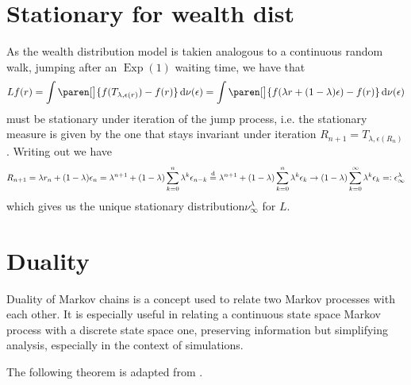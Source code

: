 \documentclass{article}
\begin{document}
{\section{Stationary for wealth dist}

As the wealth distribution model is takien analogous to a continuous random walk, jumping after an $\operatorname*{Exp}(1)$ waiting time, we have that
\[
Lf(r)
= \int \paren[\big]{f(T_{\lambda, \epsilon(r)}) - f(r) } \diff \nu(\epsilon)
= \int \paren[\big]{f(\lambda r + (1 - \lambda)\epsilon) - f(r) } \diff \nu(\epsilon)
\]
must be stationary under iteration of the jump process, i.e. the stationary measure is given by the one that stays invariant under iteration $R_{n+1} = T_{\lambda, \epsilon(R_n)}$. Writing out we have
\[
R_{n+1} = \lambda r_n + (1-\lambda)\epsilon_n
\\= \lambda^{n+1} + (1-\lambda)\sum_{k=0}^n \lambda^{k} \epsilon_{n-k}
\\\overset{\mathop{}\!\mathrm{d}}{=} \lambda^{n+1} + (1-\lambda)\sum_{k=0}^n \lambda^{k} \epsilon_{k}
\to
 (1-\lambda)\sum_{k=0}^{\infty} \lambda^{k} \epsilon_{k} =\vcentcolon \epsilon_{\infty}^{\lambda}
\]
which gives us the unique stationary distribution$\nu_{\infty}^{\lambda}$ for $L$.



\section{Duality}
Duality of Markov chains is a concept used to relate two Markov processes with each other. It is especially useful in relating a continuous state space Markov process with a discrete state space one, preserving information but simplifying analysis, especially in the context of simulations.

The following theorem is adapted from \cite{barbour2000transition}.

}
\end{document}
